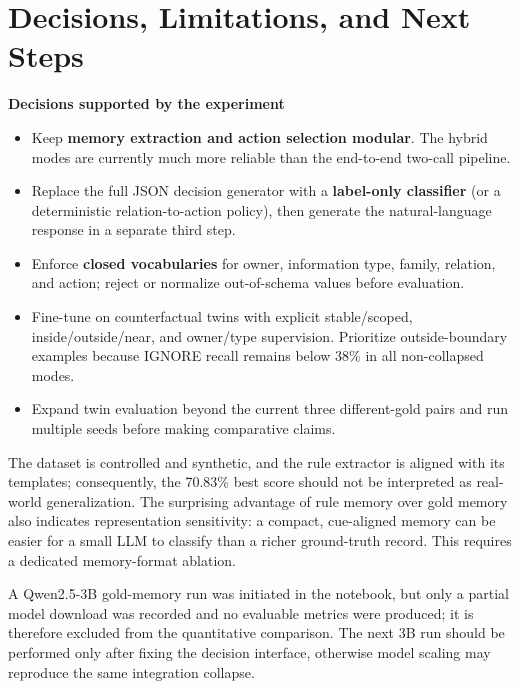 \documentclass[10pt]{article}
\begin{document}
\section{Decisions, Limitations, and Next Steps}
\begin{tcolorbox}[colback=lightgray,colframe=navy,boxrule=0.7pt,arc=2mm]
\textbf{Decisions supported by the experiment}
\begin{itemize}
  \item Keep \textbf{memory extraction and action selection modular}. The hybrid modes are currently much more reliable than the end-to-end two-call pipeline.
  \item Replace the full JSON decision generator with a \textbf{label-only classifier} (or a deterministic relation-to-action policy), then generate the natural-language response in a separate third step.
  \item Enforce \textbf{closed vocabularies} for owner, information type, family, relation, and action; reject or normalize out-of-schema values before evaluation.
  \item Fine-tune on counterfactual twins with explicit stable/scoped, inside/outside/near, and owner/type supervision. Prioritize outside-boundary examples because IGNORE recall remains below 38\% in all non-collapsed modes.
  \item Expand twin evaluation beyond the current three different-gold pairs and run multiple seeds before making comparative claims.
\end{itemize}
\end{tcolorbox}

The dataset is controlled and synthetic, and the rule extractor is aligned with its templates; consequently, the 70.83\% best score should not be interpreted as real-world generalization. The surprising advantage of rule memory over gold memory also indicates representation sensitivity: a compact, cue-aligned memory can be easier for a small LLM to classify than a richer ground-truth record. This requires a dedicated memory-format ablation.

A Qwen2.5-3B gold-memory run was initiated in the notebook, but only a partial model download was recorded and no evaluable metrics were produced; it is therefore excluded from the quantitative comparison. The next 3B run should be performed only after fixing the decision interface, otherwise model scaling may reproduce the same integration collapse.
\end{document}
